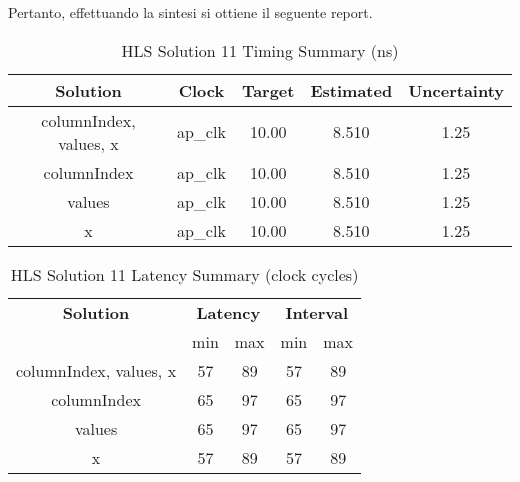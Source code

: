 Pertanto, effettuando la sintesi si ottiene il seguente report.

\begin{table}[H]
	\centering
	\begin{tabular}{|c|c|c|c|c|}
		\hline
		\textbf{Solution} & \textbf{Clock} & \textbf{Target} & \textbf{Estimated} & \textbf{Uncertainty} \\
		\hline
		columnIndex, values, x & ap\_clk & 10.00 & 8.510 & 1.25 \\
		\hline
		columnIndex & ap\_clk & 10.00 & 8.510 & 1.25 \\
		\hline
		values & ap\_clk & 10.00 & 8.510 & 1.25 \\
		\hline
		x & ap\_clk & 10.00 & 8.510 & 1.25 \\
		\hline
	\end{tabular}
	\caption{HLS Solution 11 Timing Summary (ns)}
	\label{tab:hls-solution-11-timing-summary}
\end{table}

\begin{table}[H]
	\centering
	\begin{tabular}{|c|c|c|c|c|}
		\hline
		\multicolumn{1}{|c|}{\textbf{Solution}} & \multicolumn{2}{|c|}{\textbf{Latency}} & \multicolumn{2}{|c|}{\textbf{Interval}} \\
		& min & max & min & max \\
		\hline
		columnIndex, values, x & 57 & 89 & 57 & 89 \\
		\hline
		columnIndex & 65 & 97 & 65 & 97 \\
		\hline
		values & 65 & 97 & 65 & 97 \\
		\hline
		x & 57 & 89 & 57 & 89 \\
		\hline
	\end{tabular}
	\caption{HLS Solution 11 Latency Summary (clock cycles)}
	\label{tab:hls-solution-11-latency-summary}
\end{table}

